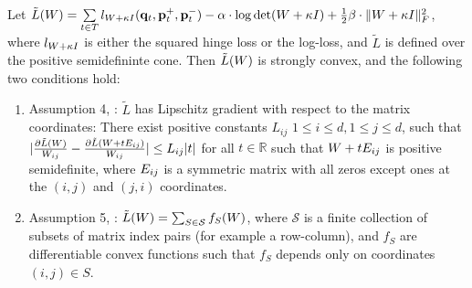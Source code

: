 \documentclass{article}
\begin{document}
\begin{theorem}
Let $\tilde{L}({W})=\sum\limits_{t\in T}{l_{{W} + \kappa I}(\mathbf{q}_t, \mathbf{p}_{t}^{+}, \mathbf{p}_{t}^{-})} - \alpha \cdot \log \det({W} + \kappa I) + \tfrac{1}{2} \beta \cdot \| {W} + \kappa I \|_{F}^{2}$, where $l_{{W} + \kappa I}$ is either the squared hinge loss or the log-loss, and $\tilde{L}$ is defined over the positive semidefininte cone.
Then $\tilde{L}({W})$ is strongly convex, and the following two conditions hold:
\begin{enumerate}
\item Assumption 4, \citet{richtarik2013optimal}: $\tilde{L}$ has Lipschitz gradient with respect to the matrix coordinates: There exist positive constants $L_{ij}$ $1 \leq i \leq d, 1 \leq j \leq d$, such that $| \frac{\partial \tilde{L}({W})}{W_{ij}} - \frac{\partial \tilde{L}({W} + t {E}_{ij})}{W_{ij}} | \leq L_{ij} |t|$ for all $t \in \mathbb{R}$ such that ${W} + t{E}_{ij}$ is positive semidefinite, where ${E}_{ij}$ is a symmetric matrix with all zeros except ones at the $(i,j)$ and $(j,i)$ coordinates.

\item Assumption 5, \citet{richtarik2013optimal}: 
$\tilde{L}({W}) = \sum_{S \in \mathcal{S}} f_S ({W})$, where $\mathcal{S}$ is a finite collection of subsets of matrix index pairs (for example a row-column), and $f_S$ are differentiable convex functions such that $f_S$ depends only on coordinates $(i,j) \in S$.
\end{enumerate}
\end{theorem}
\end{document}
